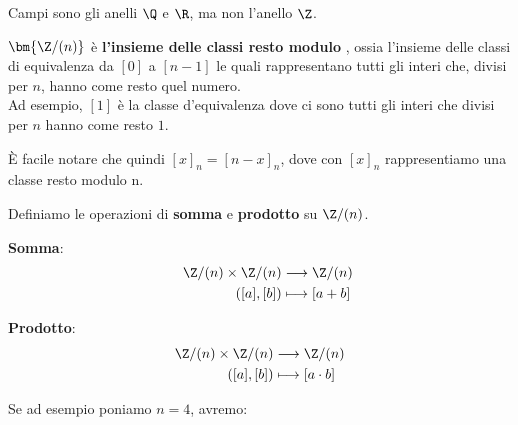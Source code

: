\documentclass[11pt, a4paper, titlepage, oneside]{scrbook}
\begin{document}
Campi sono gli anelli $\Q$ e $\R$, ma non l'anello $\Z$.

\begin{Definizione}
\label{def-Z/(n)}
$\bm{\Z/(n)}$ è \textbf{l'insieme delle classi resto modulo} , ossia l'insieme delle classi di equivalenza
da $[0]$ a $[n-1]$ le quali rappresentano tutti gli interi che, divisi per $n$, hanno come resto quel numero.\\ 
Ad esempio, $[1]$ è la classe d'equivalenza dove ci sono tutti gli interi che divisi per $n$ hanno come resto $1$.
\end{Definizione}
È facile notare che quindi $[x]_n = [n-x]_n$, dove con $[x]_n$ rappresentiamo una classe resto modulo n.

Definiamo le operazioni di \textbf{somma} e \textbf{prodotto} su $\Z/(n)$.

\bigskip

\begin{minipage}[c]{0.45\textwidth}
    \centering
    {\Large\textbf{Somma}:}
    \begin{align*}
        \hspace{0.4cm}\Z/(n) \times \Z/(n) &\longrightarrow \Z/(n) \\
        \hspace{0.4cm}([a],[b]) &\longmapsto [a + b]
    \end{align*}
\end{minipage}
\begin{minipage}[c]{0.45\textwidth}
    \centering
    {\Large\textbf{Prodotto}:}
    \begin{align*}
        \Z/(n) \times \Z/(n) &\longrightarrow \Z/(n) \\
        ([a],[b]) &\longmapsto [a \cdot b]
    \end{align*}
\end{minipage}

\bigskip

Se ad esempio poniamo $n = 4$, avremo:

\bigskip
\end{document}

